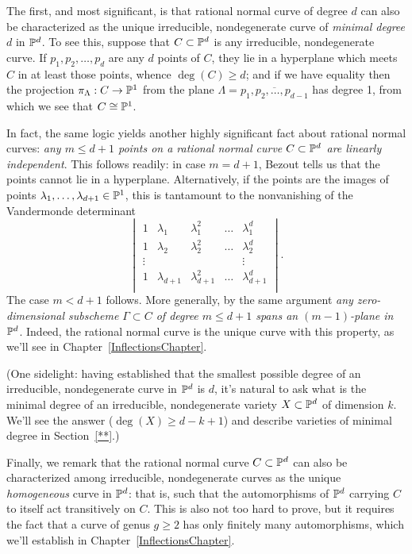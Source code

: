 The first, and most significant, is that  rational normal curve of degree $d$ can also be characterized as the unique irreducible, nondegenerate curve of \emph{minimal degree} $d$ in ${\mathbb P}^d$. To see this, suppose that $C \subset {\mathbb P}^d$ is any irreducible, nondegenerate curve. If $p_1,p_2,\dots,p_{d}$ are any $d$ points of $C$, they lie in a hyperplane which meets $C$ in at least those points, whence $\deg(C) \geq d$; and if we have equality then the projection $\pi_\Lambda : C \to {\mathbb P}^1$ from the plane $\Lambda = \overline{p_1,p_2,\dots,p_{d-1}}$ has degree 1, from which we see that $C \cong {\mathbb P}^1$.

In fact, the same logic yields another highly significant fact about rational normal curves: \emph{any $m \leq d+1$ points on a rational normal curve $C \subset {\mathbb P}^d$ are linearly independent}. This follows readily: in case $m=d+1$, Bezout tells us that the points cannot lie in a hyperplane. Alternatively, if the points are the images of points $\lambda_1,\dots,\lambda_{d+1} \in {\mathbb P}^1$, this is tantamount to the nonvanishing of the Vandermonde determinant
$$
\begin{vmatrix}
1 & \lambda_1 & \lambda_1^2 & \dots & \lambda_1^d \\
1 & \lambda_2 & \lambda_2^2 & \dots & \lambda_2^d \\
\vdots & & & & \vdots \\
1 & \lambda_{d+1} & \lambda_{d+1}^2 & \dots & \lambda_{d+1}^d \\
\end{vmatrix}.
$$
The case $m < d+1$ follows. More generally, by the same argument \emph{any zero-dimensional subscheme $\Gamma \subset C$ of degree $m \leq d+1$ spans an $(m-1)$-plane in ${\mathbb P}^d$}. Indeed, the rational normal curve is the unique curve with this property, as we'll see in Chapter~\ref{InflectionsChapter}.

(One sidelight: having established that the smallest possible degree of an irreducible, nondegenerate curve in ${\mathbb P}^d$ is $d$, it's natural to ask what is the minimal degree of an irreducible, nondegenerate variety $X \subset {\mathbb P}^d$ of dimension $k$. We'll see the answer ($\deg(X) \geq d-k+1$) and describe varieties of minimal degree in Section~\ref{**}.)

Finally, we remark that the rational normal curve $C \subset {\mathbb P}^d$ can also be characterized among irreducible, nondegenerate curves as the unique \emph{homogeneous} curve in ${\mathbb P}^d$: that is, such that the automorphisms of ${\mathbb P}^d$ carrying $C$ to itself act transitively on $C$. This is also not too hard to prove, but it requires the fact that a curve of genus $g \geq 2$ has only finitely many automorphisms, which we'll establish in Chapter~\ref{InflectionsChapter}.


